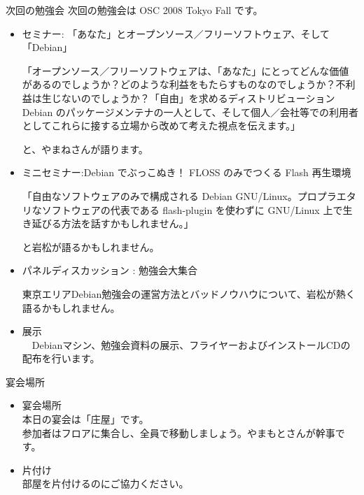 \documentclass[cjk,dvipdfmx,12pt]{beamer}
\begin{document}
\begin{frame}{次回の勉強会}
次回の勉強会は OSC 2008 Tokyo Fall です。
\begin{itemize}
 \item セミナー: 「あなた」とオープンソース／フリーソフトウェア、そして「Debian」

「オープンソース／フリーソフトウェアは、「あなた」にとってどんな価値があるのでしょうか？どのような利益をもたらすものなのでしょうか？不利益は生じないのでしょうか？「自由」を求めるディストリビューション　Debian のパッケージメンテナの一人として、そして個人／会社等での利用者としてこれらに接する立場から改めて考えた視点を伝えます。」

と、やまねさんが語ります。
\end{itemize}
\end{frame}

\begin{frame}
\begin{itemize}
 \item ミニセミナー:Debian でぶっこぬき！ FLOSS のみでつくる Flash 再生環境

「自由なソフトウェアのみで構成される Debian GNU/Linux。プロプラエタリなソフトウェアの代表である flash-plugin を使わずに GNU/Linux 上で生き延びる方法を話すかもしれません。」

と岩松が語るかもしれません。

\item パネルディスカッション : 勉強会大集合

東京エリアDebian勉強会の運営方法とバッドノウハウについて、岩松が熱く語るかもしれません。

\item 展示\\
　Debianマシン、勉強会資料の展示、フライヤーおよびインストールCDの配布を行います。
\end{itemize}
\end{frame}

\begin{frame}{宴会場所}
\begin{itemize}
 \item 宴会場所\\
       本日の宴会は「庄屋」です。\\
       参加者はフロアに集合し、全員で移動しましょう。やまもとさんが幹事です。
 \item 片付け\\
       部屋を片付けるのにご協力ください。
\end{itemize}

\end{frame}
\end{document}
